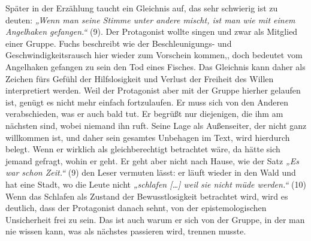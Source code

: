 \documentclass[12pt,a4paper]{article}
\begin{document}
%
Später in der Erzählung taucht ein Gleichnis auf, das sehr schwierig ist zu deuten: \textit{„Wenn man seine Stimme unter andere mischt, ist man wie mit einem Angelhaken gefangen.“} (9). Der Protagonist wollte singen und zwar als Mitglied einer Gruppe. Fuchs beschreibt wie der Beschleunigungs- und Geschwindigkeitsrausch hier wieder zum Vorschein kommen,\autocite[see 67]{fuchs}, doch bedeutet vom Angelhaken gefangen zu sein den Tod eines Fisches. Das Gleichnis kann daher als Zeichen fürs Gefühl der Hilfslosigkeit und Verlust der Freiheit des Willen interpretiert werden. Weil der Protagonist aber mit der Gruppe hierher gelaufen ist, genügt es nicht mehr einfach fortzulaufen. Er muss sich von den Anderen verabschieden, was er auch bald tut. Er begrüßt nur diejenigen, die ihm am nächsten sind, wobei niemand ihn ruft. Seine Lage als Außenseiter, der nicht ganz willkommen ist, und daher sein gesamtes Unbehagen im Text, wird hierdurch belegt. Wenn er wirklich als gleichberechtigt betrachtet wäre, da hätte sich jemand gefragt, wohin er geht. Er geht aber nicht nach Hause, wie der Satz \textit{„Es war schon Zeit.“} (9) den Leser vermuten lässt: er läuft wieder in den Wald und hat eine Stadt, wo die Leute nicht \textit{„schlafen […] weil sie nicht müde werden.“} (10) Wenn das Schlafen als Zustand der Bewusstlosigkeit betrachtet wird, wird es deutlich, dass der Protagonist danach sehnt, von der epistemologischen Unsicherheit frei zu sein. Das ist auch warum er sich von der Gruppe, in der man nie wissen kann, was als nächstes passieren wird, trennen musste.
\clearpage
%
\end{document}
